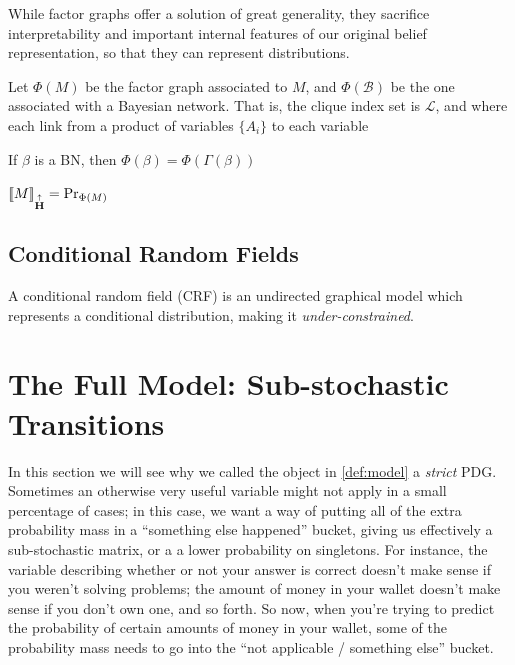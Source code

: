 \documentclass{article}
\newcommand\changeon{\color{note-fg} }
\newcommand\changeoff{\color{black} }
\newcommand{\MN}{PDG}%
\newcommand\MaxEnt{{\overset{\uparrow}{\mathbf H}}}
\newcommand\bmu{\boldsymbol{\mu}}
\begin{document}
	While factor graphs offer a solution of great generality, they sacrifice interpretability and important internal features of our original belief representation, so that they can represent distributions.
	
	
	
	\changeon
	Let $\Phi(M)$ be the factor graph associated to $M$, and $\Phi(\mathcal B)$ be the one associated with a Bayesian network. That is, the clique index set is $\mathcal L$, and where each link from a product of variables $\{A_i\}$ to 
	each variable 
	

	\begin{prop}
		If $\beta$ is a BN, then $\Phi(\beta)  = \Phi(\Gamma(\beta))$
	\end{prop}


	\begin{theorem}
		$\bbr{M}_\MaxEnt = \Pr_{\Phi(M)}$
	\end{theorem}
	\changeoff
	
	
	\subsection{Conditional Random Fields}
	A conditional random field (CRF) is an undirected graphical model which represents a conditional distribution, making it \emph{under-constrained}.	
		

	\section{The Full Model: Sub-stochastic Transitions} \label{sec:full-model}
	
	In this section we will see why we called the object in \cref{def:model} a \textit{strict} \MN.	
	Sometimes an otherwise very useful variable might not apply in a small percentage of cases; in this case, we want a way of putting all of the extra probability mass in a ``something else happened'' bucket, giving us effectively a sub-stochastic matrix, or a a lower probability on singletons. For instance, the variable describing whether or not your answer is correct doesn't make sense if you weren't solving problems; the amount of money in your wallet doesn't make sense if you don't own one, and so forth. So now, when you're trying to predict the probability of certain amounts of money in your wallet, some of the probability mass needs to go into the ``not applicable / something else'' bucket. 
	
\end{document}
